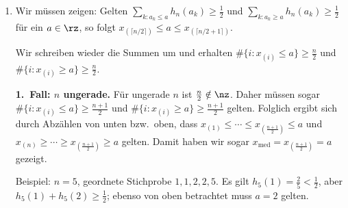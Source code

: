 \begin{satz}
\begin{enumerate}[label=(\alph*)]
        \textbf{1.\ Fall: $n$ ungerade.} Für ungerade $n$ ist $x_{\mathrm{med}}=x_{\left(\frac{n+1}2\right)}$, und daher
        \[
            \#\{i\in\{1,\dots,n\}: x_{(i)}\leq x_{\mathrm{med}}\} \geq \frac{n+1}{2} \geq \frac n2 ,
        \]
        weil mindestens die $\frac{n+1}2$ Elemente $x_{(1)}\leq\cdots\leq x_{\left(\frac{n+1}2\right)}$ in der Menge sind.
        Daraus folgt die Behauptung.

        Beispiel: $n=5$, geordnete Stichprobe $1,1,2,2,5$ (Augenzahl beim Würfeln).
        Es ist $x_{\mathrm{med}}=x_{(3)}=2$, und
        $\frac15\#\{i: x_{(i)}\leq 2\} = \frac45\geq\frac12$, ebenso $\sum_{k: a_k\leq x_{\mathrm{med}}} h_5(a_k) = h_5(1)+h_5(2)=\frac25+\frac25=\frac45\geq\frac12$.

        \textbf{2.\ Fall: $n$ gerade.} Für gerade $n$ ist $x_{\mathrm{med}}=\frac12\left[x_{\left(\frac n2\right)}+x_{\left(\frac n2+1\right)}\right]\geq x_{\left(\frac n2\right)}$, weil $x_{\left(\frac n2+1\right)}\geq x_{\left(\frac n2\right)}$.
        Daher gilt
        $\#\{i: x_{(i)}\leq x_{\mathrm{med}}\}\geq \frac n2$, weil mindestens die $\frac n2$ Elemente $x_{(1)}\leq\cdots\leq x_{\left(\frac n2\right)}$ in der Menge sind.

        Beispiel: $n=6$, geordnete Stichprobe $1,1,1,2,2,5$.
        Es ist $x_{\mathrm{med}}=\frac12[x_{(3)}+x_{(4)}]=\frac32$, und
        $\frac16\#\{i: x_{(i)}\leq \frac32\} = \frac36=\frac12\geq\frac12$, ebenso $h_6(1)=\frac36=\frac12\geq\frac12$.

        \item Wir müssen zeigen: Gelten $\sum_{k: a_k\leq a} h_n(a_k)\geq\frac12$ und $\sum_{k: a_k\geq a} h_n(a_k)\geq\frac12$ für ein $a\in\rz$, so folgt $x_{(\lceil n/2\rceil)}\leq a\leq x_{(\lceil n/2+1\rceil)}$.

        Wir schreiben wieder die Summen um und erhalten $\#\{i: x_{(i)}\leq a\}\geq\frac n2$ und $\#\{i: x_{(i)}\geq a\}\geq\frac n2$.

        \textbf{1.\ Fall: $n$ ungerade.} Für ungerade $n$ ist $\frac n2\notin\nz$.
        Daher müssen sogar $\#\{i: x_{(i)}\leq a\}\geq\frac{n+1}2$ und $\#\{i: x_{(i)}\geq a\}\geq\frac{n+1}2$ gelten.
        Folglich ergibt sich durch Abzählen von unten bzw.\ oben, dass $x_{(1)}\leq\cdots\leq x_{\left(\frac{n+1}2\right)}\leq a$ und $x_{(n)}\geq\cdots\geq x_{\left(\frac{n+1}2\right)}\geq a$ gelten.
        Damit haben wir sogar $x_{\mathrm{med}}=x_{\left(\frac{n+1}2\right)}=a$ gezeigt.

        Beispiel: $n=5$, geordnete Stichprobe $1,1,2,2,5$.
        Es gilt $h_5(1)=\frac25<\frac12$, aber $h_5(1)+h_5(2)\geq\frac12$; ebenso von oben betrachtet muss $a=2$ gelten.


\end{enumerate}
\end{satz}
